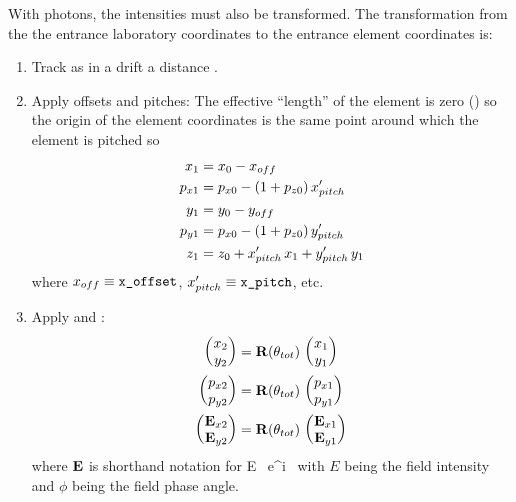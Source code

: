 With photons, the intensities must also be transformed.
The transformation from the the entrance laboratory coordinates to
the entrance element coordinates is:
\begin{enumerate}
\item
Track as in a drift a distance .
\item
{}
Apply offsets and pitches: The effective ``length'' of the element is
zero () so the origin of the element coordinates
is the same point around which the element is pitched so
\begin{align}
  x_1    &= x_0 - x_{off} \nonumber \\
  p_{x1} &= p_{x0} - (1 + p_{z0}) \, x'_{pitch} \nonumber \\
  y_1    &= y_0 - y_{off} \\
  p_{y1} &= p_{x0} - (1 + p_{z0}) \, y'_{pitch} \nonumber \\
  z_1    &= z_0 + x'_{pitch} \, x_1 + y'_{pitch} \, y_1 \nonumber
\end{align}
where $x_{off} \equiv \vn{x_offset}$, $x'_{pitch} \equiv \vn{x_pitch}$, etc.
\item
Apply  and :
\begin{align}
  \begin{pmatrix} x_2 \\ y_2 \end{pmatrix} &=
    {{\bf R}} (\theta_{tot}) \,   
  \begin{pmatrix} x_1 \\ y_1 \end{pmatrix} \nonumber \\
  \begin{pmatrix} p_{x2} \\ p_{y2} \end{pmatrix} &=
    {{\bf R}} (\theta_{tot}) \, 
  \begin{pmatrix} p_{x1} \\ p_{y1} \end{pmatrix} \label{xyrtxy} \\ 
  \begin{pmatrix} {{\bf E}}_{x2} \\ {{\bf E}}_{y2} \end{pmatrix} &=
    {{\bf R}} (\theta_{tot}) \,   \begin{pmatrix} {{\bf E}}_{x1} \\ {{\bf E}}_{y1} \end{pmatrix} \nonumber
\end{align}
where ${{\bf E}}$ is shorthand notation for
\Begineq
  \bE \equiv E \, e^{i \, \phi}
\Endeq
with $E$ being the field intensity and $\phi$ being the field phase angle.

\end{enumerate}
